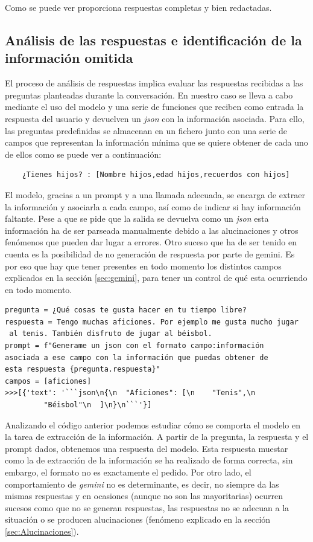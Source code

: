 Como se puede ver proporciona respuestas completas y bien redactadas.

\subsection{Análisis de las respuestas e identificación de la información omitida}
\label{analisisres}

El proceso de análisis de respuestas implica evaluar las respuestas recibidas a las preguntas planteadas durante la conversación. En nuestro caso se lleva a cabo mediante el uso del modelo y una serie de funciones que reciben como entrada la respuesta del usuario y devuelven un \textit{json} con la información asociada. Para ello, las preguntas predefinidas se almacenan en un fichero junto con una serie de campos que representan la información mínima que se quiere obtener de cada uno de ellos como se puede ver a continuación:
\begin{verbatim}
	¿Tienes hijos? : [Nombre hijos,edad hijos,recuerdos con hijos]
\end{verbatim}

El modelo, gracias a un prompt y a una llamada adecuada, se encarga de extraer la información y asociarla a cada campo, así como de indicar si hay información faltante. Pese a que se pide que la salida se devuelva como un \textit{json} esta información ha de ser parseada manualmente debido a las alucinaciones y otros fenómenos que pueden dar lugar a errores. Otro suceso que ha de ser tenido en cuenta es la posibilidad de no generación de respuesta por parte de gemini. Es por eso que hay que tener presentes en todo momento los distintos campos explicados en la sección \ref{sec:gemini}, para tener un control de qué esta ocurriendo en todo momento. 
\begin{verbatim}
pregunta = ¿Qué cosas te gusta hacer en tu tiempo libre?	
respuesta = Tengo muchas aficiones. Por ejemplo me gusta mucho jugar
 al tenis. También disfruto de jugar al béisbol.
prompt = f"Generame un json con el formato campo:información 
asociada a ese campo con la información que puedas obtener de 
esta respuesta {pregunta.respuesta}"
campos = [aficiones]
>>>[{'text': '```json\n{\n  "Aficiones": [\n    "Tenis",\n   
		 "Béisbol"\n  ]\n}\n```'}]
\end{verbatim}
Analizando el código anterior podemos estudiar cómo se comporta el modelo en la tarea de extracción de la información. A partir de la pregunta, la respuesta y el prompt dados, obtenemos una respuesta del modelo. Esta respuesta muestar como la de extracción de la información se ha realizado de forma correcta, sin embargo, el formato no es exactamente el pedido. Por otro lado, el comportamiento de \textit{gemini} no es determinante, es decir, no siempre da las mismas respuestas y en ocasiones (aunque no son las mayoritarias) ocurren sucesos como que no se generan respuestas, las respuestas no se adecuan a la situación o se producen alucinaciones (fenómeno explicado en la sección \ref{sec:Alucinaciones}). 


